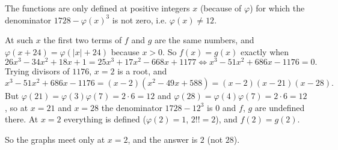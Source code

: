 The functions are only defined at positive integers $x$ (because of $\varphi$) for which the denominator $1728-\varphi(x)^3$ is not zero, i.e. $\varphi(x)\ne12$.

At such $x$ the first two terms of $f$ and $g$ are the same numbers, and $\varphi(x+24)=\varphi(|x|+24)$ because $x>0$. So $f(x)=g(x)$ exactly when
\[26x^3-34x^2+18x+1=25x^3+17x^2-668x+1177\iff x^3-51x^2+686x-1176=0.\]
Trying divisors of $1176$, $x=2$ is a root, and
\[x^3-51x^2+686x-1176=(x-2)\left(x^2-49x+588\right)=(x-2)(x-21)(x-28).\]
But $\varphi(21)=\varphi(3)\varphi(7)=2\cdot6=12$ and $\varphi(28)=\varphi(4)\varphi(7)=2\cdot6=12$, so at $x=21$ and $x=28$ the denominator $1728-12^3$ is $0$ and $f$, $g$ are undefined there. At $x=2$ everything is defined ($\varphi(2)=1$, $2!!=2$), and $f(2)=g(2)$.

So the graphs meet only at $x=2$, and the answer is $\boxed{2}$ (not $28$).
